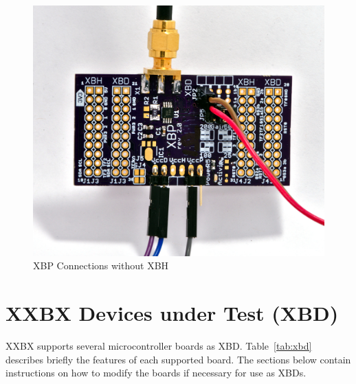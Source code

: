 \documentclass[twoside,11pt]{cergdoc}
\begin{document}
\begin{figure}[ht]
  \begin{center}
    \includegraphics[scale=1]{figures/xbp-no-xbh-connections}
    \caption{XBP Connections without XBH}\label{fig:noxbh}
  \end{center}
\vspace{-1ex}
\end{figure}

\chapter{XXBX Devices under Test (XBD)}\label{sec:xbd}
XXBX supports several microcontroller boards as XBD. Table~\ref{tab:xbd}
describes briefly the features of each supported board. The sections below
contain instructions on how to modify the boards if necessary for use as XBDs.
\end{document}
